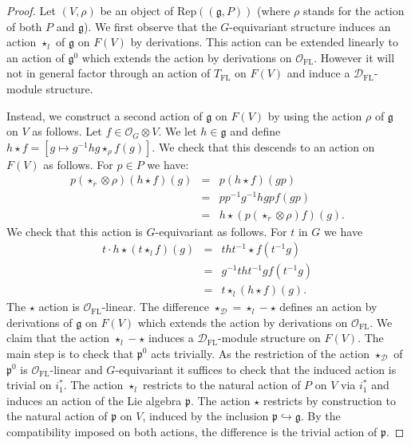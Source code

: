 \documentclass[10pt, oneside]{amsart}
\numberwithin{equation}{subsection}
\theoremstyle{definition}
\theoremstyle{remark}
\newcommand{\opn}[1]{\operatorname{#1}}
\begin{document}
\begin{proof} 
Let $(V, \rho)$ be an object of $\mathrm{Rep}((\mathfrak{g},P))$ (where $\rho$ stands for the action of both $P$ and $\mathfrak{g}$). 
We first observe that the $G$-equivariant structure induces an action $\star_l$ of  $\mathfrak{g}$ on $F(V)$ by derivations. This action can be extended linearly to an action of $\mathfrak{g}^0 $ which extends the action by derivations on $\mathcal{O}_{\opn{FL}}$. However it will not in general factor through an action of $T_{\opn{FL}}$ on $F(V)$ and induce a $\mathcal{D}_{\opn{FL}}$-module structure. 

Instead, we construct a second action of $\mathfrak{g}$ on $F(V)$ by using the action $\rho$ of $\mathfrak{g}$ on $V$ as follows. Let $f \in \mathcal{O}_G \otimes V$. We let $h \in \mathfrak{g}$ and define $h\star f = [g \mapsto g^{-1} h g \star_\rho f(g)]$.  We check that this descends to an action on $F(V)$ as follows. For $p \in P$ we have:
\begin{eqnarray*}
p (\star_r \otimes \rho)   (h \star f)(g)& = &p (h\star f) (g p)  \\
&=& p p^{-1} g^{-1} h g p f(gp)\\
&=& h \star (p (\star_r \otimes \rho) f)(g).
\end{eqnarray*}
We check that this action is $G$-equivariant as follows. For $t$ in $G$ we have
\begin{eqnarray*}
t \cdot h \star (t \star_l f)(g) & = &  t ht^{-1} \star f(t^{-1} g ) \\
&=& g^{-1} t h t^{-1} g f(t^{-1} g ) \\
&=& t \star_l (  h \star f) (g).
\end{eqnarray*}
The $\star$ action is $\mathcal{O}_{\opn{FL}}$-linear. 
The difference $\star_{\mathcal{D}} = \star_l - \star$ defines an action  by derivations of $\mathfrak{g}$ on $F(V)$ which extends the  action by derivations on $\mathcal{O}_{\opn{FL}}$. 
We claim that  the action $\star_l - \star$ induces a $\mathcal{D}_{\opn{FL}}$-module structure on $F(V)$.
The main step is  to check that $\mathfrak{p}^0$ acts trivially.  As the restriction of the action $\star_{\mathcal{D}}$ of $\mathfrak{p}^0$ is $\mathcal{O}_{\opn{FL}}$-linear and $G$-equivariant it suffices to check 
that the induced action  is trivial on $i_1^{*}$. The action $\star_l$ restricts to the natural action of $P$ on $V$ via $i_1^*$ and induces an action of the Lie algebra $\mathfrak{p}$. The action $\star$ restricts by construction to the natural action of $\mathfrak{p}$ on $V$, induced by the inclusion $\mathfrak{p} \hookrightarrow \mathfrak{g}$. By the compatibility imposed on both actions, the difference is the  trivial action of $\mathfrak{p}$. 
\end{proof}
\end{document}
